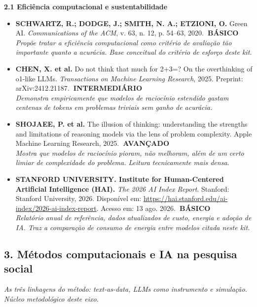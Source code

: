 \documentclass[11pt,a4paper]{article}
\newcommand{\refc}[2]{\item #1\\{\footnotesize\color{cinzaescuro}\textit{#2}}}
\newcommand{\nivelbasico}{\hfill\colorbox{verdeCodigo}{\color{white}\scriptsize\poppinsmed\textbf{~BÁSICO~}}}
\newcommand{\nivelinterm}{\hfill\colorbox{amareloSol}{\color{black}\scriptsize\poppinsmed\textbf{~INTERMEDIÁRIO~}}}
\newcommand{\nivelavancado}{\hfill\colorbox{laranjaDestaque}{\color{white}\scriptsize\poppinsmed\textbf{~AVANÇADO~}}}
\begin{document}
\textbf{\poppinsmed\color{azulUNIclaro}2.1 Eficiência computacional e sustentabilidade}
\begin{itemize}[leftmargin=1.4em]
\refc{\textbf{SCHWARTZ, R.; DODGE, J.; SMITH, N. A.; ETZIONI, O.} Green AI. \textit{Communications of the ACM}, v. 63, n. 12, p. 54--63, 2020.\nivelbasico}{Propõe tratar a eficiência computacional como critério de avaliação tão importante quanto a acurácia. Base conceitual do critério de esforço deste kit.}
\refc{\textbf{CHEN, X. et al.} Do not think that much for 2+3=? On the overthinking of o1-like LLMs. \textit{Transactions on Machine Learning Research}, 2025. Preprint: arXiv:2412.21187.\nivelinterm}{Demonstra empiricamente que modelos de raciocínio estendido gastam centenas de tokens em problemas triviais sem ganho de acurácia.}
\refc{\textbf{SHOJAEE, P. et al.} The illusion of thinking: understanding the strengths and limitations of reasoning models via the lens of problem complexity. Apple Machine Learning Research, 2025.\nivelavancado}{Mostra que modelos de raciocínio pioram, não melhoram, além de um certo limiar de complexidade do problema. Leitura tecnicamente mais densa.}
\refc{\textbf{STANFORD UNIVERSITY. Institute for Human-Centered Artificial Intelligence (HAI).} \textit{The 2026 AI Index Report}. Stanford: Stanford University, 2026. Disponível em: \url{https://hai.stanford.edu/ai-index/2026-ai-index-report}. Acesso em: 13 ago. 2026.\nivelbasico}{Relatório anual de referência, dados atualizados de custo, energia e adoção de IA. Traz a comparação de consumo de energia entre modelos citada neste kit.}
\end{itemize}

\clearpage
\subsection*{3. Métodos computacionais e IA na pesquisa social}
\textit{As três linhagens do método: text-as-data, LLMs como instrumento e simulação. Núcleo metodológico deste eixo.}
\end{document}
